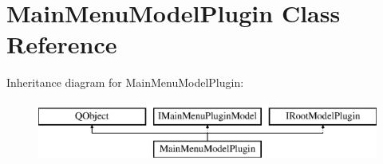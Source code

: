 \hypertarget{class_main_menu_model_plugin}{}\section{Main\+Menu\+Model\+Plugin Class Reference}
\label{class_main_menu_model_plugin}
Inheritance diagram for Main\+Menu\+Model\+Plugin\+:\begin{figure}[H]
\begin{center}
\leavevmode
\includegraphics[height=2.000000cm]{class_main_menu_model_plugin}
\end{center}
\end{figure}
